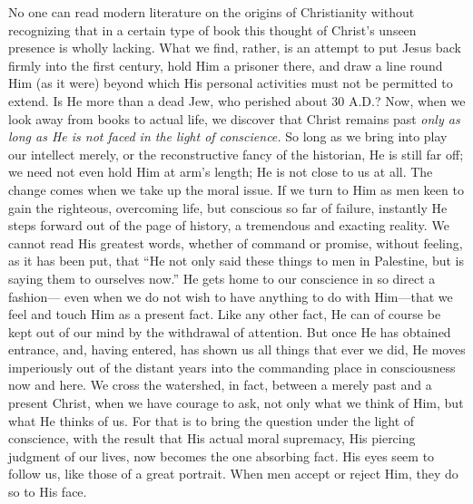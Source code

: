 \documentclass[12pt,a5paper,oneside]{book}
\begin{document}
No one can read modern literature on the
origins of Christianity without recognizing that
in a certain type of book this thought of Christ's
unseen presence is wholly lacking. What we
find, rather, is an attempt to put Jesus back
firmly into the first century, hold Him a prisoner
there, and draw a line round Him (as it were)
beyond which His personal activities must not
be permitted to extend. Is He more than
a dead Jew, who perished about 30 \textsc{A.D.}?
Now, when we look away from books to actual
life, we discover that Christ remains past \textit{only
as long as He is not faced in the light
of conscience.} So long as we bring into play
our intellect merely, or the reconstructive fancy
of the historian, He is still far off; we
need not even hold Him at arm's length; He
is not close to us at all. The change comes
when we take up the moral issue. If we turn
to Him as men keen to gain the righteous,
overcoming life, but conscious so far of failure,
instantly He steps forward out of the
page of history, a tremendous and exacting
reality. We cannot read His greatest words,
whether of command or promise, without
feeling, as it has been put, that ``He not only
said these things to men in Palestine, but is
saying them to ourselves now.'' He gets home
to our conscience in so direct a fashion---
even when we do not wish to have anything
to do with Him---that we feel and touch Him
as a present fact. Like any other fact, He
can of course be kept out of our mind by the
withdrawal of attention. But once He has
obtained entrance, and, having entered, has
shown us all things that ever we did, He moves
imperiously out of the distant years into
the commanding place in consciousness now
and here. We cross the watershed, in fact,
between a merely past and a present Christ,
when we have courage to ask, not only what
we think of Him, but what He thinks of us.
For that is to bring the question under the
light of conscience, with the result that His
actual moral supremacy, His piercing judgment
of our lives, now becomes the one absorbing
fact. His eyes seem to follow us, like those of
a great portrait. When men accept or reject
Him, they do so to His face.
\end{document}
